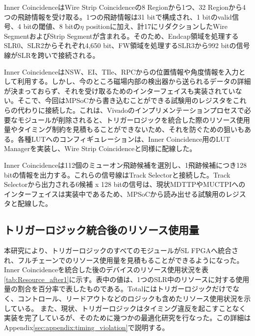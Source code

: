 Inner CoincidenceはWire Strip Coincidenceの8 Regionから1つ、32 Regionから4つの飛跡情報を受け取る。1つの飛跡情報は31 bitで構成され、1 bitのvalid信号、4 bitの\pt 閾値、8 bitの$\eta$ positionに加え、計17にリダクションしたWire SegmentおよびStrip Segmentが含まれる。そのため、Endcap領域を処理するSLR0、SLR2からそれぞれ4,650 bit、FW領域を処理するSLR3から992 bitの信号線がSLRを跨いで接続される。

Inner CoincidenceはNSW、EI、TIle、RPCからの位置情報や角度情報を入力として利用する。しかし、今のところ磁場内部の検出器から送られるデータの詳細が決まっておらず、それを受け取るためのインターフェイスも実装されていない。そこで、今回はMPSoCから書き込むことができる試験用のレジスタをこれらの代わりに接続した。これは、Vivadoのインプリメンテーションプロセスで必要なモジュールが削除されると、トリガーロジックを統合した際のリソース使用量やタイミング制約を見積もることができないため、それを防ぐための狙いもある。各種LUTへのコンフィギュレーションは、Inner Coincidence用のLUT Managerを実装し、Wire Strip Coincidenceと同様に配線した。

Inner Coincidenceは112個のミューオン飛跡候補を選別し、1飛跡候補につき128 bitの情報を出力する。これらの信号線はTrack Selectorと接続した。Track Selectorから出力される6候補 x 128 bitの信号は、現状MDTTPやMUCTPIへのインターフェイスは実装中であるため、MPSoCから読み出せる試験用のレジスタと配線した。

\subsection{トリガーロジック統合後のリソース使用量}

本研究により、トリガーロジックのすべてのモジュールがSL FPGAへ統合され、フルチェーンでのリソース使用量を見積もることができるようになった。
Inner Coincidenceを統合した後のデバイスのリソース使用状況を表\ref{tab:Resource_after1}に示す。表中の値は、1つのSLR中のリソースに対する使用量の割合を百分率で表したものである。Totalにはトリガーロジックだけでなく、コントロール、リードアウトなどのロジックも含めたリソース使用状況を示している。
また、現状、トリガーロジックはタイミング違反を起こすことなく実装を完了しているが、そのために幾つかの最適化研究を行なった。この詳細はAppendix\ref{sec:appendix:timing_violation}で説明する。

